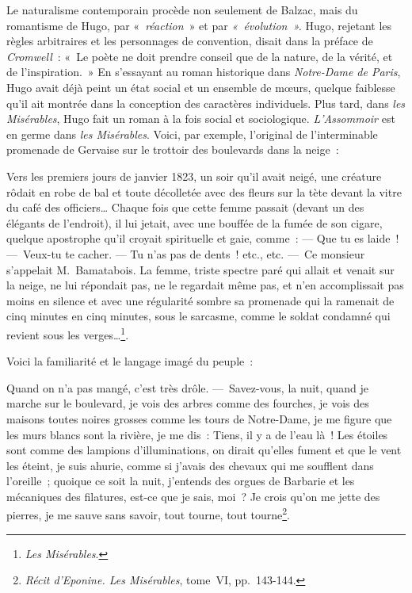 \documentclass[french,twoside]{book} %
\newenvironment{quoteblock}%
  {\begin{quoting}}
  {\end{quoting}}
\newenvironment{quotebar}{%
    \def\FrameCommand{{\color{rubric!10!}\vrule width 0.5em} \hspace{0.9em}}%
    \def\OuterFrameSep{\itemsep} %
    \MakeFramed {\advance\hsize-\width \FrameRestore}
  }%
  {%
    \endMakeFramed
  }
\renewenvironment{quoteblock}%
  {%
    \savenotes
    \setstretch{0.9}
    \normalfont
    \begin{quotebar}
  }
  {%
    \end{quotebar}
    \spewnotes
  }
\begin{document}
Le naturalisme contemporain procède non seulement de Balzac, mais du romantisme de Hugo, par « \emph{réaction} » et par \emph{« évolution ».} Hugo, rejetant les règles arbitraires et les personnages de convention, disait dans la préface de \emph{Cromwell} : « Le poète ne doit prendre conseil que de la nature, de la vérité, et de l’inspiration. » En s’essayant au roman historique dans \emph{Notre-Dame de Paris}, Hugo avait déjà peint un état social et un ensemble de mœurs, quelque faiblesse qu’il ait montrée dans la conception des caractères individuels. Plus tard, dans \emph{les Misérables}, Hugo fait un roman à la fois social et sociologique. \emph{L’Assommoir} est en germe dans \emph{les Misérables}. Voici, par exemple, l’original de l’interminable promenade de Gervaise sur le trottoir des boulevards dans la neige :\par

\begin{quoteblock}
 \noindent Vers les premiers jours de janvier 1823, un soir qu’il avait neigé, une créature rôdait en robe de bal et toute décolletée avec des fleurs sur la tète devant la vitre du café des officiers… Chaque fois que cette femme passait (devant un des élégants de l’endroit), il lui jetait, avec une bouffée de la fumée de son cigare, quelque apostrophe qu’il croyait spirituelle et gaie, comme : — Que tu es laide ! — Veux-tu te cacher. — Tu n’as pas de dents ! etc., etc. — Ce monsieur s’appelait M. Bamatabois. La femme, triste spectre paré qui allait et venait sur la neige, ne lui répondait pas, ne le regardait même pas, et n’en accomplissait pas moins en silence et avec une régularité sombre sa promenade qui la ramenait de cinq minutes en cinq minutes, sous le sarcasme, comme le soldat condamné qui revient sous les verges…\footnote{\emph{Les Misérables}.}.
 \end{quoteblock}

\noindent Voici la familiarité et le langage imagé du peuple :\par

\begin{quoteblock}
 \noindent Quand on n’a pas mangé, c’est très drôle. — Savez-vous, la nuit, quand je marche sur le boulevard, je vois des arbres comme des fourches, je vois des maisons toutes noires grosses comme les tours de Notre-Dame, je me figure que les murs blancs sont la rivière, je me dis : Tiens, il y a de l’eau là ! Les étoiles sont comme des lampions d’illuminations, on dirait qu’elles fument et que le vent les éteint, je suis ahurie, comme si j’avais des chevaux qui me soufflent dans l’oreille ; quoique ce soit la nuit, j’entends des orgues de Barbarie et les mécaniques des filatures, est-ce que je sais, moi ? Je crois qu’on me jette des pierres, je me sauve sans savoir, tout tourne, tout tourne\footnote{\emph{Récit d’Eponine. Les Misérables}, tome VI, pp. 143-144.}.
 \end{quoteblock}
\end{document}
